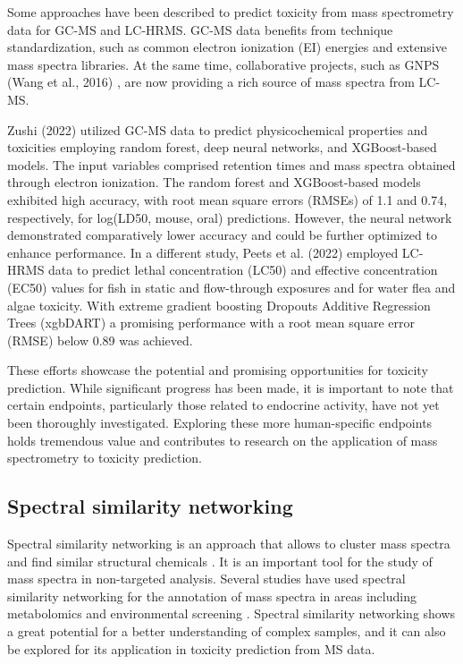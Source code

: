 Some approaches have been described to predict toxicity from mass spectrometry data for GC-MS and LC-HRMS. GC-MS data benefits from technique standardization, such as common electron ionization (EI) energies and extensive mass spectra libraries. At the same time, collaborative projects, such as GNPS (Wang et al., 2016) \cite{Wang2016}, are now providing a rich source of mass spectra from LC-MS. 

Zushi (2022) \cite{zushi_direct_2022} utilized GC-MS data to predict physicochemical properties and toxicities employing random forest, deep neural networks, and XGBoost-based models. The input variables comprised retention times and mass spectra obtained through electron ionization. The random forest and XGBoost-based models exhibited high accuracy, with root mean square errors (RMSEs) of 1.1 and 0.74, respectively, for log(LD50, mouse, oral) predictions. However, the neural network demonstrated comparatively lower accuracy and could be further optimized to enhance performance. In a different study, Peets et al. (2022) \cite{peets_MS2tox_2022} employed LC-HRMS data to predict lethal concentration (LC50) and effective concentration (EC50) values for fish in static and flow-through exposures and for water flea and algae toxicity. With extreme gradient boosting Dropouts Additive Regression Trees (xgbDART) a promising performance with a root mean square error (RMSE) below 0.89 was achieved.

These efforts showcase the potential and promising opportunities for toxicity prediction. While significant progress has been made, it is important to note that certain endpoints, particularly those related to endocrine activity, have not yet been thoroughly investigated. Exploring these more human-specific endpoints holds tremendous value and contributes to research on the application of mass spectrometry to toxicity prediction.

\subsection*{Spectral similarity networking}

Spectral similarity networking is an approach that allows to cluster mass spectra and find similar structural chemicals \cite{Frank2007} \cite{wang_sharing_2016}. It is an important tool for the study of mass spectra in non-targeted analysis. Several studies have used spectral similarity networking for the annotation of mass spectra in areas including metabolomics \cite{PerezDeSouza2020} and environmental screening \cite{Oberleitner2021}\cite{Wu2023}. Spectral similarity networking shows a great potential for a better understanding of complex samples, and it can also be explored for its application in toxicity prediction from MS data.

